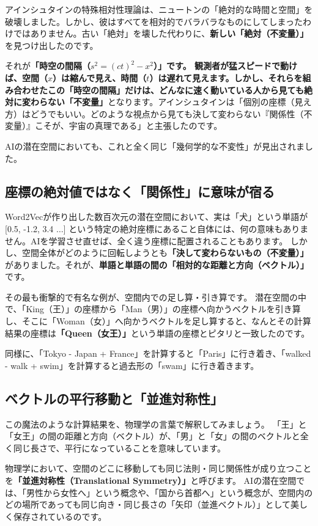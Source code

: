 アインシュタインの特殊相対性理論は、ニュートンの「絶対的な時間と空間」を破壊しました。しかし、彼はすべてを相対的でバラバラなものにしてしまったわけではありません。古い「絶対」を壊した代わりに、\textbf{新しい「絶対（不変量）」}を見つけ出したのです。

それが\textbf{「時空の間隔（\ensuremath{s^2=(ct)^2-x^2}）」です。 観測者が猛スピードで動けば、空間（\(x\)）は縮んで見え、時間（\(t\)）は遅れて見えます。しかし、それらを組み合わせたこの「時空の間隔」だけは、どんなに速く動いている人から見ても絶対に変わらない「不変量」}となります。アインシュタインは「個別の座標（見え方）はどうでもいい。どのような視点から見ても決して変わらない『関係性（不変量）』こそが、宇宙の真理である」と主張したのです。

AIの潜在空間においても、これと全く同じ「幾何学的な不変性」が見出されました。

\subsection{座標の絶対値ではなく「関係性」に意味が宿る}

Word2Vecが作り出した数百次元の潜在空間において、実は「犬」という単語が [0.5, -1.2, 3.4 \ensuremath{\dots}] という特定の絶対座標にあること自体には、何の意味もありません。AIを学習させ直せば、全く違う座標に配置されることもあります。 しかし、空間全体がどのように回転しようとも\textbf{「決して変わらないもの（不変量）」}がありました。それが、\textbf{単語と単語の間の「相対的な距離と方向（ベクトル）」}です。

その最も衝撃的で有名な例が、空間内での足し算・引き算です。 潜在空間の中で、「King（王）」の座標から「Man（男）」の座標へ向かうベクトルを引き算し、そこに「Woman（女）」へ向かうベクトルを足し算すると、なんとその計算結果の座標は\textbf{「Queen（女王）」}という単語の座標とピタリと一致したのです。

同様に、「Tokyo - Japan + France」を計算すると「Paris」に行き着き、「walked - walk + swim」を計算すると過去形の「swam」に行き着きます。

\subsection{ベクトルの平行移動と「並進対称性」}

この魔法のような計算結果を、物理学の言葉で解釈してみましょう。 「王」と「女王」の間の距離と方向（ベクトル）が、「男」と「女」の間のベクトルと全く同じ長さで、平行になっていることを意味しています。

物理学において、空間のどこに移動しても同じ法則・同じ関係性が成り立つことを\textbf{「並進対称性（Translational Symmetry）」}と呼びます。 AIの潜在空間では、「男性から女性へ」という概念や、「国から首都へ」という概念が、空間内のどの場所であっても同じ向き・同じ長さの「矢印（並進ベクトル）」として美しく保存されているのです。

